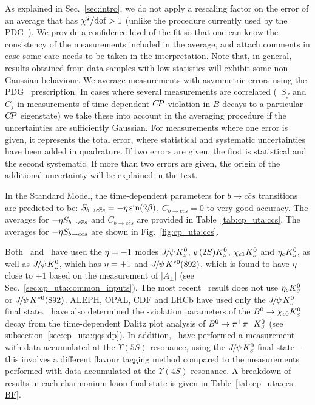 As explained in Sec.~\ref{sec:intro},
we do not apply a rescaling factor on the error of an average
that has $\chi^2/{\rm dof} > 1$ 
(unlike the procedure currently used by the PDG~\cite{PDG_2010}).
We provide a confidence level of the fit so that
one can know the consistency of the measurements included in the average,
and attach comments in case some care needs to be taken in the interpretation.
Note that, in general, results obtained from data samples with low statistics
will exhibit some non-Gaussian behaviour.
We average measurements with asymmetric errors 
using the PDG~\cite{PDG_2010} prescription.
In cases where several measurements are correlated
(\eg\ $S_f$ and $C_f$ in measurements of time-dependent $C\!P$ violation
in $B$ decays to a particular $C\!P$ eigenstate)
we take these into account in the averaging procedure
if the uncertainties are sufficiently Gaussian.
For measurements where one error is given, 
it represents the total error, 
where statistical and systematic uncertainties have been added in quadrature.
If two errors are given, the first is statistical and the second systematic.
If more than two errors are given,
the origin of the additional uncertainty will be explained in the text.

\clearpage
{}
\label{sec:cp_uta:ccs}

\label{sec:cp_uta:ccs:cp_eigen}

In the Standard Model, the time-dependent parameters for
$b \to c\bar c s$ transitions are predicted to be: 
$S_{b \to c\bar c s} = - \etacp \sin(2\beta)$,
$C_{b \to c\bar c s} = 0$ to very good accuracy.
The averages for $-\etacp S_{b \to c\bar c s}$ and $C_{b \to c\bar c s}$
are provided in Table~\ref{tab:cp_uta:ccs}.
The averages for $-\etacp S_{b \to c\bar c s}$ 
are shown in Fig.~\ref{fig:cp_uta:ccs}.

Both \babar\  and \belle\ have used the ${\eta} = -1$ modes
${J\mskip -3mu/\mskip -2mu\psi\mskip 2mu} K^0_{\scriptscriptstyle S}$, $\psi(2S) K^0_{\scriptscriptstyle S}$, $\chi_{c1} K^0_{\scriptscriptstyle S}$ and $\eta_c K^0_{\scriptscriptstyle S}$, 
as well as ${J\mskip -3mu/\mskip -2mu\psi\mskip 2mu} K^0_{\scriptscriptstyle L}$, which has ${\eta} = +1$
and ${J\mskip -3mu/\mskip -2mu\psi\mskip 2mu} K^{*0}(892)$, which is found to have ${\eta}$ close to $+1$
based on the measurement of $\left| A_\perp \right|$ 
(see Sec.~\ref{sec:cp_uta:common_inputs}).
The most recent \belle\ result does not use $\eta_c K^0_{\scriptscriptstyle S}$ or ${J\mskip -3mu/\mskip -2mu\psi\mskip 2mu} K^{*0}(892)$.
ALEPH, OPAL, CDF and LHCb have used only the ${J\mskip -3mu/\mskip -2mu\psi\mskip 2mu} K^0_{\scriptscriptstyle S}$ final state.
\babar\ have also determined the \CP-violation parameters of the
$B^0\to\chi_{c0} K^0_{\scriptscriptstyle S}$ decay from the time-dependent Dalitz plot analysis of
$B^0 \to \pi^+\pi^-K^0_{\scriptscriptstyle S}$ (see subsection~\ref{sec:cp_uta:qqs:dp}).
In addition, \belle\ have performed a measurement with data accumulated at the $\Upsilon(5S)$ resonance, using the ${J\mskip -3mu/\mskip -2mu\psi\mskip 2mu}K^0_{\scriptscriptstyle S}$ final state -- this involves a different flavour tagging method compared to the measurements performed with data accumulated at the $\Upsilon(4S)$ resonance.
A breakdown of results in each charmonium-kaon final state is given in 
Table~\ref{tab:cp_uta:ccs-BF}.

